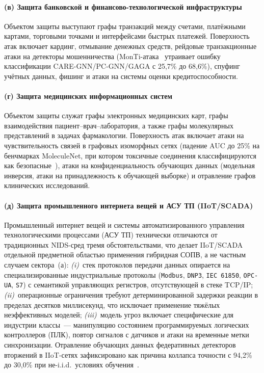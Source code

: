 \paragraph{(в) Защита банковской и финансово-технологической инфраструктуры}\label{subsubsec:sector_fintech}

Объектом защиты выступают графы транзакций между счетами,
платёжными картами, торговыми точками и интерфейсами быстрых
платежей. Поверхность атак включает кардинг, отмывание денежных
средств, рейдовые транзакционные атаки на детекторы мошенничества
(MonTi-атака~\cite{MonTi2025} утраивает ошибку классификации
CARE-GNN/PC-GNN/GAGA с 25{,}7\% до 68{,}6\%), спуфинг учётных
данных, фишинг и атаки на системы оценки кредитоспособности.

\paragraph{(г) Защита медицинских информационных систем}\label{subsubsec:sector_medical}

Объектом защиты служат графы электронных медицинских карт, графы
взаимодействия пациент--врач--лаборатория, а также графы
молекулярных представлений в задачах фармакологии. Поверхность атак
включает атаки на чувствительность связей в графовых изоморфных
сетях (падение AUC до 25\% на бенчмарках MoleculeNet, при котором
токсичные соединения классифицируются как
безопасные~\cite{EdgeSensitivity2025}), атаки на конфиденциальность
обучающих данных (модельная инверсия, атаки на принадлежность к
обучающей выборке) и отравление графов клинических исследований.

\paragraph{(д) Защита промышленного интернета вещей и АСУ ТП (IIoT/SCADA)}\label{subsubsec:sector_iiot}

Промышленный интернет вещей и системы автоматизированного управления
технологическими процессами (АСУ ТП) технически отличаются от
традиционных NIDS-сред тремя обстоятельствами, что делает
IIoT/SCADA отдельной предметной областью применения гибридная СОПВ, а
не частным случаем сектора~(а):
\emph{(i)}~стек протоколов передачи данных опирается на
специализированные индустриальные протоколы (\texttt{Modbus},
\texttt{DNP3}, \texttt{IEC~61850}, \texttt{OPC-UA}, \texttt{S7}) с
семантикой управляющих регистров, отсутствующей в стеке TCP/IP;
\emph{(ii)}~операционные ограничения требуют детерминированной
задержки реакции в пределах десятков миллисекунд, что исключает
применение тяжёлых неэффективных моделей;
\emph{(iii)}~модель угроз включает специфические для индустрии классы~---
манипуляцию состоянием программируемых логических контроллеров
(ПЛК), повтор сигналов с датчиков и атаки на временные метки
синхронизации. Отравление обучающих данных федеративных детекторов
вторжений в IIoT-сетях зафиксировано как причина коллапса точности
с 94{,}2\% до 30{,}0\% при не-i.i.d.\ условиях
обучения~\cite{FerragPoisoning2023}.

